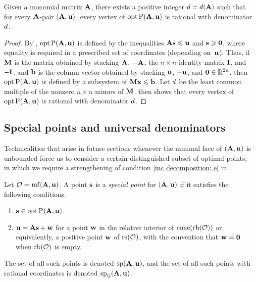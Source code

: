\documentclass{amsart}
\begin{document}
\begin{theorem}
   \label{uniform denominators for vertices:  T}
   Given a monomial matrix $\mathbf{A}$, there exists a positive integer $d = d(\mathbf{A})$ such that for every $\mathbf{A}$-pair $(\mathbf{A}, \mathbf{u})$, every vertex of $\operatorname{opt} \mathrm{P}(\mathbf{A}, \mathbf{u})$ is rational with denominator $d$.
\end{theorem}

\begin{proof}
   By , $\operatorname{opt} \mathrm{P}(\mathbf{A},\mathbf{u})$ is defined by the inequalities $\mathbf{A}\mathbf{s} \leqslant \mathbf{u}$ and $\mathbf{s}\geqslant \mathbf{0}$, where equality is required in a prescribed set of coordinates (depending on~$\mathbf{u}$).
   Thus, if $\mathbf{M}$ is the matrix obtained by stacking $\mathbf{A}$, $-\mathbf{A}$, the $n \times n$ identity matrix $\mathbf{I}$, and $-\mathbf{I}$, and $\mathbf{b}$ is the column vector obtained by stacking $\mathbf{u}$, $-\mathbf{u}$, and $\mathbf{0}\in \mathbb{R}^{2n}$, then $\operatorname{opt} \mathrm{P}(\mathbf{A},\mathbf{u})$ is defined by a subsystem of $\mathbf{M} \mathbf{x} \leqslant \mathbf{b}$.
   Let $d$ be the least common multiple of the nonzero $n\times n$ minors of $\mathbf{M}$.
    then shows that every vertex of $\operatorname{opt} \mathrm{P}(\mathbf{A},\mathbf{u})$ is rational with denominator $d$.
\end{proof}

\subsection{Special points and universal denominators}

Technicalities that arise in future sections whenever the minimal face of $(\mathbf{A}, \mathbf{u})$ is unbounded force us to consider a certain distinguished subset of optimal points, in which we require a strengthening of condition \ref{mc decomposition: e} in .

\begin{definition}
   \label{mc: D}
   Let $\mathcal{O} = \operatorname{mf}(\mathbf{A}, \mathbf{u})$.
   A point $\mathbf{s}$ is a \emph{special point} for $(\mathbf{A}, \mathbf{u})$ if it satisfies the following conditions.
   \begin{enumerate}
      \item $\mathbf{s} \in \operatorname{opt} \mathrm{P}(\mathbf{A}, \mathbf{u})$.
      \item \label{item: special condition of special points}
      $\mathbf{u} = \mathbf{A} \mathbf{s} + \mathbf{w}$ for a point $\mathbf{w}$ in the relative interior of $\operatorname{cone}(\operatorname{rb}(\mathcal{O}))$ or, equivalently, a positive point $\mathbf{w}$ of $\operatorname{rs}(\mathcal{O})$, with the convention that $\mathbf{w}=\mathbf{0}$ when $\operatorname{rb}(\mathcal{O})$ is empty.
   \end{enumerate}
   The set of all such points is denoted $\operatorname{sp}(\mathbf{A}, \mathbf{u})$, and the set of all such points with rational coordinates is denoted $\operatorname{sp}_{\mathbb{Q}}(\mathbf{A}, \mathbf{u})$.
\end{definition}
\end{document}

